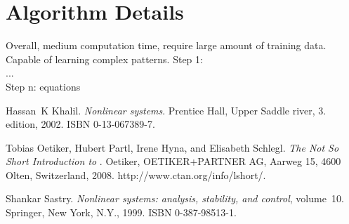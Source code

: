 \documentclass[a4paper,12pt,oneside,onecolumn]{article} %
\begin{document}
\section*{Algorithm Details}
Overall, medium computation time, require large amount of training data. Capable of learning complex patterns. 
Step 1:\\
...\\
Step n:
equations


\begin{thebibliography}{99}
Hassan~K Khalil.
\newblock \emph{Nonlinear systems}.
\newblock Prentice Hall, Upper Saddle river, 3. edition, 2002.
\newblock ISBN 0-13-067389-7.

Tobias Oetiker, Hubert Partl, Irene Hyna, and Elisabeth Schlegl.
\newblock \emph{The Not So Short Introduction to \LaTeXe}.
\newblock Oetiker, OETIKER+PARTNER AG, Aarweg 15, 4600 Olten, Switzerland,
  2008.
\newblock http://www.ctan.org/info/lshort/.

Shankar Sastry.
\newblock \emph{Nonlinear systems: analysis, stability, and control},
  volume~10.
\newblock Springer, New York, N.Y., 1999.
\newblock ISBN 0-387-98513-1.
\end{thebibliography}
\end{document}
